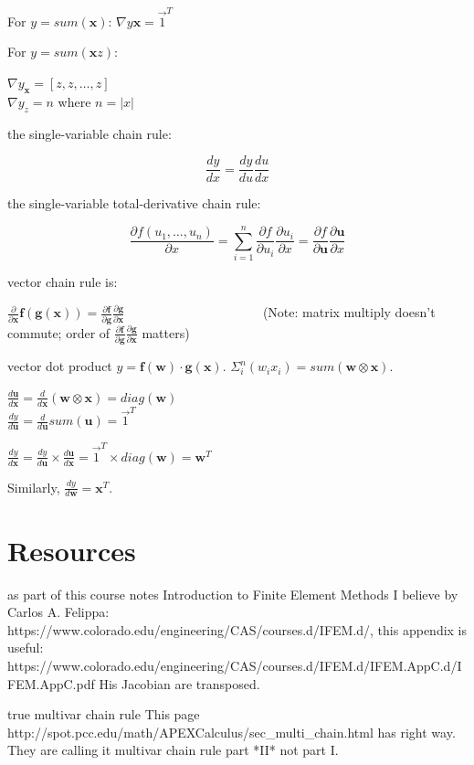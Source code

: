 \documentclass[11pt]{article}
\begin{document}
For $y = sum(\mathbf{x})$: $\nabla y\mathbf{x} = \vec{1}^T$

For $y = sum(\mathbf{x}z)$: 

$\nabla y_\mathbf{x} = [z, z, \ldots, z]$\\
$\nabla y_z = n$ where $n = |x|$

the single-variable chain rule:

\[
\frac{dy}{dx} = \frac{dy}{du}\frac{du}{dx}
\]

the single-variable total-derivative chain rule:

\[
\frac{\partial f(u_1,\ldots,u_n)}{\partial x} = \sum_{i=1}^n \frac{\partial f}{\partial u_i}\frac{\partial  u_i}{\partial  x} = \frac{\partial f}{\partial \mathbf{u}} \frac{\partial \mathbf{u}}{\partial x}
\]

vector chain rule is:

$\frac{\partial}{\partial \mathbf{x}} \mathbf{f}(\mathbf{g}(\mathbf{x})) = \frac{\partial \mathbf{f}}{\partial \mathbf{g}}\frac{\partial\mathbf{g}}{\partial \mathbf{x}}$ ~~~~~~~~~~~~~~~~~~~~~(Note: matrix multiply doesn't commute; order of $\frac{\partial \mathbf{f}}{\partial \mathbf{g}}\frac{\partial\mathbf{g}}{\partial \mathbf{x}}$ matters)

vector dot product $y = \mathbf{f(w)} \cdot \mathbf{g(x)}$. $\Sigma_i^n (w_i x_i) = sum(\mathbf{w} \otimes \mathbf{x})$.

$\frac{d \mathbf{u}}{d\mathbf{x}} = \frac{d}{d\mathbf{x}} (\mathbf{w} \otimes \mathbf{x}) = diag(\mathbf{w})$\\
$\frac{dy}{d\mathbf{u}} = \frac{d}{d\mathbf{u}} sum(\mathbf{u}) = \vec{1}^T$

$\frac{dy}{d\mathbf{x}} = \frac{dy}{d\mathbf{u}} \times \frac{d\mathbf{u}}{d\mathbf{x}} = \vec{1}^T \times diag(\mathbf{w}) = \mathbf{w}^T$

Similarly, $\frac{dy}{d\mathbf{w}} = \mathbf{x}^T$.

\section{Resources}

as part of this course notes Introduction to Finite Element Methods I believe by Carlos A. Felippa: https://www.colorado.edu/engineering/CAS/courses.d/IFEM.d/, this appendix is useful:
https://www.colorado.edu/engineering/CAS/courses.d/IFEM.d/IFEM.AppC.d/IFEM.AppC.pdf His Jacobian are transposed.

true multivar chain rule  This page http://spot.pcc.edu/math/APEXCalculus/sec\_multi\_chain.html has right way. They are calling it multivar chain rule part *II* not part I.
\end{document}
